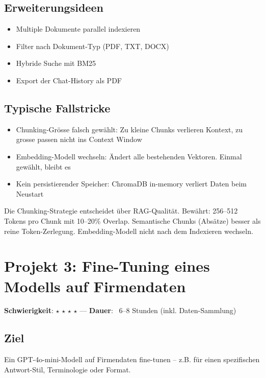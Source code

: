 \subsection*{Erweiterungsideen}
\begin{itemize}[leftmargin=*]
    \item Multiple Dokumente parallel indexieren
    \item Filter nach Dokument-Typ (PDF, TXT, DOCX)
    \item Hybride Suche mit BM25
    \item Export der Chat-History als PDF
\end{itemize}

\subsection*{Typische Fallstricke}
\begin{itemize}[leftmargin=*]
    \item Chunking-Grösse falsch gewählt: Zu kleine Chunks verlieren Kontext, zu grosse passen nicht ins Context Window
    \item Embedding-Modell wechseln: Ändert alle bestehenden Vektoren. Einmal gewählt, bleibt es
    \item Kein persistierender Speicher: ChromaDB in-memory verliert Daten beim Neustart
\end{itemize}

\begin{praxishinweis}
Die Chunking-Strategie entscheidet über RAG-Qualität. Bewährt: 256--512 Tokens pro Chunk mit 10--20\% Overlap. Semantische Chunks (Absätze) besser als reine Token-Zerlegung. Embedding-Modell nicht nach dem Indexieren wechseln.
\end{praxishinweis}

\section{Projekt 3: Fine-Tuning eines Modells auf Firmendaten}

\textbf{Schwierigkeit}: $\star$ $\star$ $\star$ $\star$ ---
\textbf{Dauer}: ~6--8 Stunden (inkl. Daten-Sammlung)

\subsection*{Ziel}
Ein GPT-4o-mini-Modell auf Firmendaten fine-tunen -- z.B. für einen spezifischen Antwort-Stil, Terminologie oder Format.

